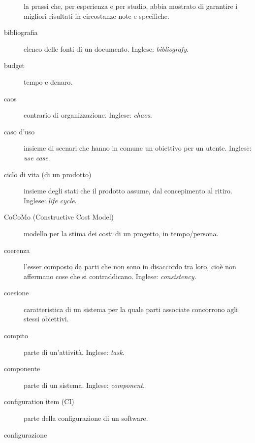 \documentclass[a4paper]{article}
\begin{document}
\begin{description}
			la prassi che, per esperienza e per studio, abbia mostrato di garantire i migliori risultati in circostanze note e specifiche.
			
	\item[bibliografia] 

			elenco delle fonti di un documento. Inglese: \emph{bibliografy}.
			
	\item[budget] 

			tempo e denaro.
			
	\item[caos] 

			contrario di organizzazione. Inglese: \emph{chaos}.
			
	\item[caso d'uso] 

			insieme di scenari che hanno in comune un obiettivo per un utente. Inglese: \emph{use case}.
			
	\item[ciclo di vita (di un prodotto)] 

			insieme degli stati che il prodotto assume, dal concepimento al ritiro. Inglese: \emph{life cycle}.
			
	\item[CoCoMo (Constructive Cost Model)] 

			modello per la stima dei costi di un progetto, in tempo/persona.
			
	\item[coerenza] 

			l'esser composto da parti che non sono in disaccordo tra loro, cioè non affermano cose che si contraddicano. Inglese: \emph{consistency}.
			
	\item[coesione] 

			caratteristica di un sistema per la quale parti associate concorrono agli stessi obiettivi.
			
	\item[compito] 

			parte di un'attività. Inglese: \emph{task}.
			
	\item[componente] 

			parte di un sistema. Inglese: \emph{component}.
			
	\item[configuration item (CI)] 

			parte della configurazione di un software.
			
	\item[configurazione] 


\end{description}
\end{document}
